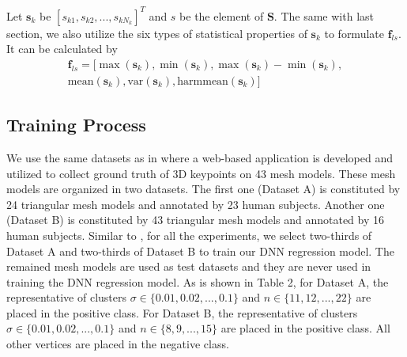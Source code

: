 \documentclass[runningheads]{article}
\begin{document}
Let \emph{$\bm{s}_k$} be \emph{$[s_{k1},s_{k2},...,s_{kN_k}]^T$} and \emph{$s$} be the element of \emph{$\bm{S}$}. The same with last section, we also utilize the six types of statistical properties of \emph{$\bm{s}_k$} to formulate \emph{$\bm{f}_{ls}$}. It can be calculated by 
\begin{equation} 
	\begin{split}
		\bm{f}_{ls} = [\max(\bm{s}_k),\min(\bm{s}_k),\max(\bm{s}_k)-\min(\bm{s}_k),\\
		\text{mean}(\bm{s}_k),\text{var}(\bm{s}_k),\text{harmmean}(\bm{s}_k)] \ \ \ \ \ \ \ 
	\end{split}
\end{equation}

\subsection{Training Process}
We use the same datasets as in \cite{song20133d,randomforest20143d,dutagaci2012evaluation} where a web-based application is developed and utilized to collect ground truth of 3D keypoints on 43 mesh models. These mesh models are organized in two datasets. The first one (Dataset A) is constituted by 24 triangular mesh models and annotated by 23 human subjects. Another one (Dataset B) is constituted by 43 triangular mesh models and annotated by 16 human subjects. Similar to \cite{randomforest20143d}, for all the experiments, we select two-thirds of Dataset A and two-thirds of Dataset B to train our DNN regression model. The remained mesh models are used as test datasets and they are never used in training the DNN regression model. As is shown in Table 2, for Dataset A, the representative of clusters \emph{$\sigma \in \{0.01,0.02,...,0.1\}$} and \emph{$n\in \{11,12,...,22\}$} are placed in the positive class. For Dataset B, the representative of clusters \emph{$\sigma \in \{0.01,0.02,...,0.1\}$} and \emph{$n\in \{8,9,...,15\}$} are placed in the positive class. All other vertices are placed in the negative class.
\end{document}
